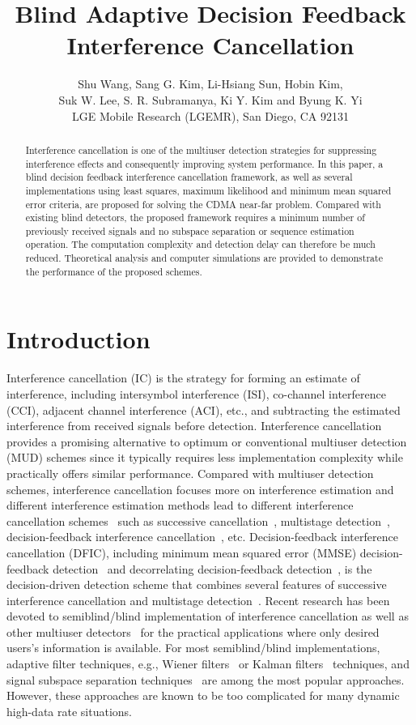 \documentclass[a4paper,10pt,fleqn, twocolumn]{IEEETran}
\title{Blind Adaptive Decision Feedback Interference Cancellation}
\author{Shu Wang, Sang G. Kim, Li-Hsiang Sun, Hobin Kim,\\
   Suk W. Lee, S. R. Subramanya, Ki Y. Kim and Byung K. Yi\\ LGE Mobile Research (LGEMR), San Diego, CA 92131}
\date{}
\begin{document}
\maketitle
\begin{abstract}\small
Interference cancellation is one of the multiuser detection
strategies for suppressing interference effects and consequently
improving system performance. In this paper, a blind decision
feedback interference cancellation framework, as well as several
implementations using least squares, maximum likelihood and
minimum mean squared error criteria, are proposed for solving the
CDMA near-far problem. Compared with existing blind detectors, the
proposed framework requires a minimum number of previously
received signals and no subspace separation or sequence estimation
operation. The computation complexity and detection delay can
therefore be much reduced. Theoretical analysis and computer
simulations are provided to demonstrate the performance of the
proposed schemes.
\end{abstract}

\section{Introduction}
Interference cancellation (IC) is the strategy for forming an
estimate of interference, including intersymbol interference
(ISI), co-channel interference (CCI), adjacent channel
interference (ACI), etc., and subtracting the estimated
interference from received signals before detection. Interference
cancellation provides a promising alternative to optimum or
conventional multiuser detection (MUD) schemes since it typically
requires less implementation complexity while practically offers
similar performance. Compared with multiuser detection schemes,
interference cancellation focuses more on interference estimation
and different interference estimation methods lead to different
interference cancellation schemes~\cite{Yoon93B,Verd98,Wang02b}
such as successive cancellation~\cite{Kohno91}, multistage
detection~\cite{Vara88}, decision-feedback interference
cancellation~\cite{Kave85,Duel93,Duel95}, etc. Decision-feedback
interference cancellation (DFIC), including minimum mean squared
error (MMSE) decision-feedback detection~\cite{Kave85} and
decorrelating decision-feedback detection~\cite{Duel93,Duel95}, is
the decision-driven detection scheme that combines several
features of successive interference cancellation and multistage
detection~\cite{Verd98}. Recent research has been devoted to
semiblind/blind implementation of interference cancellation as
well as other multiuser detectors~\cite{Madh94,Wang98,Zhang02} for
the practical applications where only desired users's information
is available. For most semiblind/blind implementations, adaptive
filter techniques, e.g., Wiener filters~\cite{Madh94} or Kalman
filters~\cite{Zhang02} techniques, and signal subspace separation
techniques~\cite{Wang98} are among the most popular approaches.
However, these approaches are known to be too complicated for many
dynamic high-data rate situations.
\end{document}
